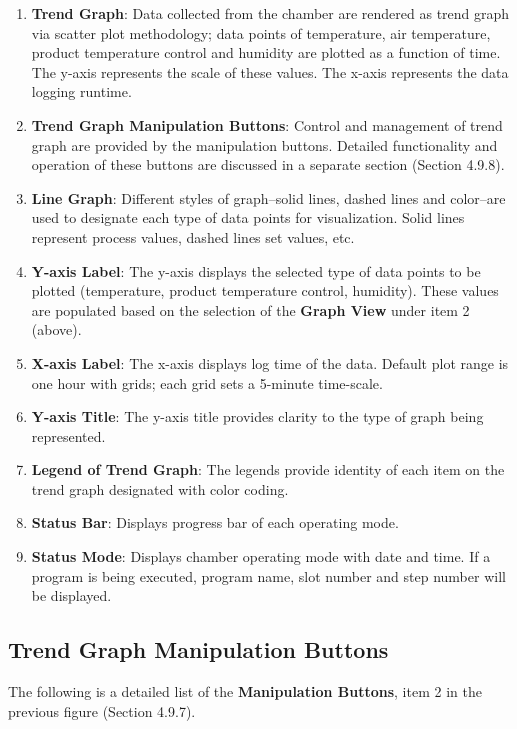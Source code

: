\begin{enumerate}
\def\labelenumi{\arabic{enumi}.}
\item
  \textbf{Trend Graph}: Data collected from the chamber are rendered as
  trend graph via scatter plot methodology; data points of temperature,
  air temperature, product temperature control and humidity are plotted
  as a function of time. The y-axis represents the scale of these
  values. The x-axis represents the data logging runtime.
\item
  \textbf{Trend Graph Manipulation Buttons}: Control and management of
  trend graph are provided by the manipulation buttons. Detailed
  functionality and operation of these buttons are discussed in a
  separate section (Section 4.9.8).
\item
  \textbf{Line Graph}: Different styles of graph--solid lines, dashed
  lines and color--are used to designate each type of data points for
  visualization. Solid lines represent process values, dashed lines set
  values, etc.
\item
  \textbf{Y-axis Label}: The y-axis displays the selected type of data
  points to be plotted (temperature, product temperature control,
  humidity). These values are populated based on the selection of the
  \textbf{Graph View} under item 2 (above).
\item
  \textbf{X-axis Label}: The x-axis displays log time of the data.
  Default plot range is one hour with grids; each grid sets a 5-minute
  time-scale.
\item
  \textbf{Y-axis Title}: The y-axis title provides clarity to the type
  of graph being represented.
\item
  \textbf{Legend of Trend Graph}: The legends provide identity of each
  item on the trend graph designated with color coding.
\item
  \textbf{Status Bar}: Displays progress bar of each operating mode.
\item
  \textbf{Status Mode}: Displays chamber operating mode with date and
  time. If a program is being executed, program name, slot number and
  step number will be displayed.
\end{enumerate}


\subsection{Trend Graph Manipulation
Buttons}

The following is a detailed list of the \textbf{Manipulation Buttons},
item 2 in the previous figure (Section 4.9.7).

